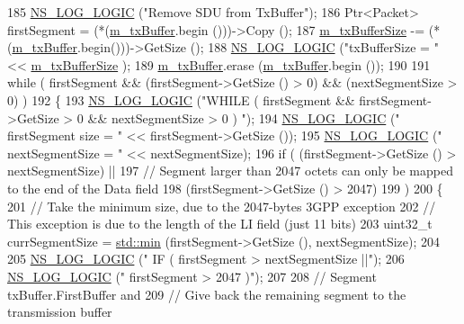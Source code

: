 \begin{DoxyCode}
185   \hyperlink{group__logging_ga88acd260151caf2db9c0fc84997f45ce}{NS\_LOG\_LOGIC} (\textcolor{stringliteral}{"Remove SDU from TxBuffer"});
186   Ptr<Packet> firstSegment = (*(\hyperlink{classns3_1_1LteRlcUm_ac2c10aa57585dbea3797d651f3dce7be}{m\_txBuffer}.begin ()))->Copy ();
187   \hyperlink{classns3_1_1LteRlcUm_a22ba9f6bd98fd3b905155ae0d0182b0d}{m\_txBufferSize} -= (*(\hyperlink{classns3_1_1LteRlcUm_ac2c10aa57585dbea3797d651f3dce7be}{m\_txBuffer}.begin()))->GetSize ();
188   \hyperlink{group__logging_ga88acd260151caf2db9c0fc84997f45ce}{NS\_LOG\_LOGIC} (\textcolor{stringliteral}{"txBufferSize      = "} << \hyperlink{classns3_1_1LteRlcUm_a22ba9f6bd98fd3b905155ae0d0182b0d}{m\_txBufferSize} );
189   \hyperlink{classns3_1_1LteRlcUm_ac2c10aa57585dbea3797d651f3dce7be}{m\_txBuffer}.erase (\hyperlink{classns3_1_1LteRlcUm_ac2c10aa57585dbea3797d651f3dce7be}{m\_txBuffer}.begin ());
190 
191   \textcolor{keywordflow}{while} ( firstSegment && (firstSegment->GetSize () > 0) && (nextSegmentSize > 0) )
192     \{
193       \hyperlink{group__logging_ga88acd260151caf2db9c0fc84997f45ce}{NS\_LOG\_LOGIC} (\textcolor{stringliteral}{"WHILE ( firstSegment && firstSegment->GetSize > 0 && nextSegmentSize > 0 )
      "});
194       \hyperlink{group__logging_ga88acd260151caf2db9c0fc84997f45ce}{NS\_LOG\_LOGIC} (\textcolor{stringliteral}{"    firstSegment size = "} << firstSegment->GetSize ());
195       \hyperlink{group__logging_ga88acd260151caf2db9c0fc84997f45ce}{NS\_LOG\_LOGIC} (\textcolor{stringliteral}{"    nextSegmentSize   = "} << nextSegmentSize);
196       \textcolor{keywordflow}{if} ( (firstSegment->GetSize () > nextSegmentSize) ||
197            \textcolor{comment}{// Segment larger than 2047 octets can only be mapped to the end of the Data field}
198            (firstSegment->GetSize () > 2047)
199          )
200         \{
201           \textcolor{comment}{// Take the minimum size, due to the 2047-bytes 3GPP exception}
202           \textcolor{comment}{// This exception is due to the length of the LI field (just 11 bits)}
203           uint32\_t currSegmentSize = \hyperlink{80211b_8c_ac6afabdc09a49a433ee19d8a9486056d}{std::min} (firstSegment->GetSize (), nextSegmentSize);
204 
205           \hyperlink{group__logging_ga88acd260151caf2db9c0fc84997f45ce}{NS\_LOG\_LOGIC} (\textcolor{stringliteral}{"    IF ( firstSegment > nextSegmentSize ||"});
206           \hyperlink{group__logging_ga88acd260151caf2db9c0fc84997f45ce}{NS\_LOG\_LOGIC} (\textcolor{stringliteral}{"         firstSegment > 2047 )"});
207 
208           \textcolor{comment}{// Segment txBuffer.FirstBuffer and}
209           \textcolor{comment}{// Give back the remaining segment to the transmission buffer}

\end{DoxyCode}
